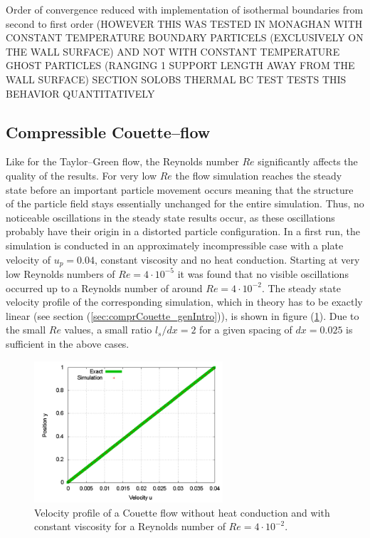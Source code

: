 \documentclass{report}
\begin{document}
Order of convergence reduced with implementation of isothermal boundaries from second to first order \cite{Cleary1999} (HOWEVER THIS WAS TESTED IN MONAGHAN WITH CONSTANT TEMPERATURE BOUNDARY PARTICELS (EXCLUSIVELY ON THE WALL SURFACE) AND NOT WITH CONSTANT TEMPERATURE GHOST PARTICLES (RANGING 1 SUPPORT LENGTH AWAY FROM THE WALL SURFACE)
SECTION SOLOBS THERMAL BC TEST TESTS THIS BEHAVIOR QUANTITATIVELY

\subsection{Compressible Couette--flow}

Like for the Taylor--Green flow, the Reynolds number $Re$ significantly affects the quality of the results. For very low $Re$ the flow simulation reaches the steady state before an important particle movement occurs meaning that the structure of the particle field stays essentially unchanged for the entire simulation. Thus, no noticeable oscillations in the steady state results occur, as these oscillations probably have their origin in a distorted particle configuration. 
In a first run, the simulation is conducted in an approximately incompressible case with a plate velocity of $u_p=0.04$, constant viscosity and no heat conduction. Starting at very low Reynolds numbers of $Re=4\cdot10^{-5}$ it was found that no visible oscillations occurred up to a Reynolds number of around $Re=4\cdot10^{-2}$. The steady state velocity profile of the corresponding simulation, which in theory has to be exactly linear (see section (\ref{sec:comprCouette_genIntro})), is shown in figure (\ref{fig:CompCouette_U_const_eta}). Due to the small $Re$ values, a small ratio $l_s/dx=2$ for a given spacing of $dx=0.025$ is sufficient in the above cases. 


\begin{figure}
 \centering
\label{fig:CompCouette_U_const_eta}
\includegraphics[width=7cm]{Graphics/results/CompressibleCouette/N2x40_supLen_dx2_eta1/U_profiles000001000019}
\caption[steady State velocity incompressible Couette]{Velocity profile of a Couette flow without heat conduction and with constant viscosity for a Reynolds number of $Re=4\cdot10^{-2}$.}
\end{figure}
\end{document}
